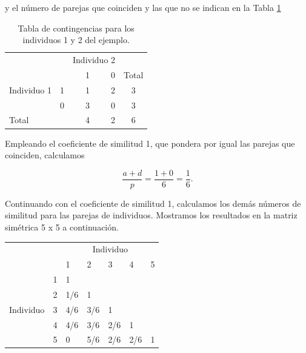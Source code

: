 \documentclass[a4paper, 20pt]{article}
\begin{document}
y el número de parejas que coinciden y las que no se indican en la Tabla \ref{tab:contingencias-ej}

\begin{table}[h]
  \centering
  \caption{Tabla de contingencias para los individuos 1 y 2 del ejemplo.}
  \label{tab:contingencias-ej}
\resizebox{6.5cm}{!} {
  \begin{tabular}{lrrrrr}
    \toprule
\multicolumn{2}{l}{\multirow{2}{*}{}} & \multicolumn{2}{c}{Individuo 2} & \\\cmidrule{3-4}
\multicolumn{2}{l}{}                  & 1        &   0       & \multicolumn{2}{c}{Total}                        \\ \midrule
Individuo 1      & 1      & 1        &  2       & \multicolumn{2}{c}{3}                     \\
                              & 0      & 3        &    0       & \multicolumn{2}{c}{3}                     \\ \midrule
\multicolumn{2}{l}{Total}            & 4     & 2     & \multicolumn{2}{c}{6}\\
\bottomrule
\end{tabular}
}
\end{table}

Empleando el coeficiente de similitud 1, que pondera por igual las parejas que coinciden, calculamos

$$\frac{a+d}{p}=\frac{1+0}{6}=\frac{1}{6}. $$

Continuando con el coeficiente de similitud 1, calculamos los demás números de similitud para las parejas de individuos. Mostramos los resultados en la matriz simétrica 5 x 5 a continuación.

\begin{table}[H]
\centering
\resizebox{7.5cm}{!} {
\begin{tabular}{lllllll}
\multicolumn{2}{l}{\multirow{2}{*}{}}               & \multicolumn{5}{c}{Individuo}                  \\
\multicolumn{2}{l}{}                                & 1   & 2   & 3   & 4   & 5                      \\ \cline{3-3} \cline{7-7} 
\multirow{5}{*}{Individuo} & \multicolumn{1}{l|}{1} & 1   &     &     &     & \multicolumn{1}{l|}{}  \\
                           & \multicolumn{1}{l|}{2} & 1/6 & 1   &     &     & \multicolumn{1}{l|}{}  \\
                           & \multicolumn{1}{l|}{3} & 4/6 & 3/6 & 1   &     & \multicolumn{1}{l|}{}  \\
                           & \multicolumn{1}{l|}{4} & 4/6 & 3/6 & 2/6 & 1   & \multicolumn{1}{l|}{}  \\
                           & \multicolumn{1}{l|}{5} & 0   & 5/6 & 2/6 & 2/6 & \multicolumn{1}{l|}{1} \\ \cline{3-3} \cline{7-7} 
\end{tabular}
}
\end{table}
\end{document}
